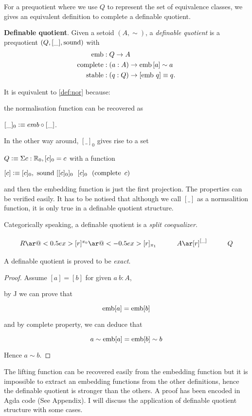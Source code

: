 For a prequotient where we use $Q$ to represent the set of equivalence classes, we gives an equivalent definition to complete a definable quotient.

\begin{definition} \textbf{Definable quotient}.
\noindent
Given a setoid $(A,\sim)$, a \emph{definable quotient} is a
prequotient $(Q, [\_], \operatorname{sound})$ with 
\begin{align*}
\operatorname{emb} &: Q \rightarrow A\\
\operatorname{complete} &: (a : A) \rightarrow \operatorname{emb} {[a]} \sim a\\
\operatorname{stable} &: (q:Q) \rightarrow [\operatorname{emb}\,q] \equiv q.
\end{align*}
\end{definition}

It is equivalent to \ref{def:nor} because:

the normalisation function can be recovered as 

$[\_]_0 \vcentcolon\equiv emb \circ [\_]$. 

In the other way around, $[\_]_0$ gives rise to a set 

$Q \vcentcolon\equiv \Sigma c : \mathbb{R}_0, [ c ]_0 = c$ with a function 

$[ c ] \vcentcolon\equiv [c]_0 , ~\operatorname{sound} ~ [[c]_0]_0 ~~ [c]_0~~ (\operatorname{complete} ~ c)$

 and then the embedding function is just the first projection. The properties can be verified easily. It has to be notised that although we call $[\_]$ as a normsalition function, it is only true in a definable quotient structure.

Categorically speaking, a definable quotient is a \emph{split coequalizer}.

\[\xymatrix{
R\ar@<0.5ex>[r]^{\pi_0}\ar@<-0.5ex>[r]_{\pi_1}& A\ar[r]^{[\_]}
& Q
}\]

A definable quotient is proved to be \emph{exact}.

\begin{proof}
Assume $[ a ] = [ b ]$ for given $a ~b : A$,

by J we can prove that

$$\operatorname{emb} [ a ] = \operatorname{emb} [ b ]$$

and by complete property, we can deduce that

$$a \sim \operatorname{emb} [ a ] = \operatorname{emb} [ b ] \sim b$$

Hence $a \sim b$.
\end{proof}

The lifting function can be recovered easily from the embedding function but it is impossible to extract an embedding functions from the other definitions, hence the definable quotient is stronger than the others. A proof has been encoded in Agda code (See Appendix). I will discuss the application of definable quotient structure with some cases.

